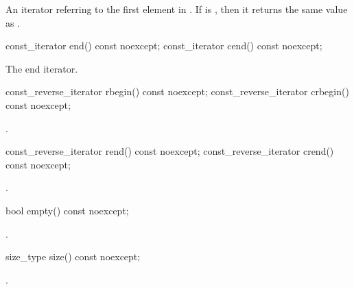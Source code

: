 \begin{itemdescr}
\pnum
\returns
An iterator referring to the first element in .
If  is ,
then it returns the same value as .
\end{itemdescr}

%
%
\begin{itemdecl}
const_iterator end() const noexcept;
const_iterator cend() const noexcept;
\end{itemdecl}

\begin{itemdescr}
\pnum
\returns
The end iterator.
\end{itemdescr}

%
%
\begin{itemdecl}
const_reverse_iterator rbegin() const noexcept;
const_reverse_iterator crbegin() const noexcept;
\end{itemdecl}

\begin{itemdescr}
\pnum
\returns
{}.
\end{itemdescr}

%
%
\begin{itemdecl}
const_reverse_iterator rend() const noexcept;
const_reverse_iterator crend() const noexcept;
\end{itemdecl}

\begin{itemdescr}
\pnum
\returns
{}.
\end{itemdescr}

%
\begin{itemdecl}
bool empty() const noexcept;
\end{itemdecl}

\begin{itemdescr}
\pnum
\returns
{}.
\end{itemdescr}

%
\begin{itemdecl}
size_type size() const noexcept;
\end{itemdecl}

\begin{itemdescr}
\pnum
\returns
{}.
\end{itemdescr}

